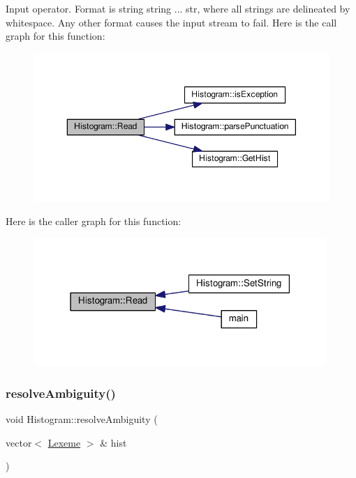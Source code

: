 Input operator. Format is string string ... str, where all strings are delineated by whitespace. Any other format causes the input stream to fail. Here is the call graph for this function\+:
\nopagebreak
\begin{figure}[H]
\begin{center}
\leavevmode
\includegraphics[width=350pt]{class_histogram_afbdf1d9a97070fd3724dbe55fd9f8570_cgraph}
\end{center}
\end{figure}
Here is the caller graph for this function\+:
\nopagebreak
\begin{figure}[H]
\begin{center}
\leavevmode
\includegraphics[width=315pt]{class_histogram_afbdf1d9a97070fd3724dbe55fd9f8570_icgraph}
\end{center}
\end{figure}
\mbox{\label{class_histogram_a5adb0e9b69168b662af9f84cbf29d5a0}} 
\subsubsection{\texorpdfstring{resolve\+Ambiguity()}{resolveAmbiguity()}}
{\footnotesize\ttfamily void Histogram\+::resolve\+Ambiguity (\begin{DoxyParamCaption}\item[{vector$<$ \hyperlink{class_lexeme}{Lexeme} $>$ \&}]{hist }\end{DoxyParamCaption})}

